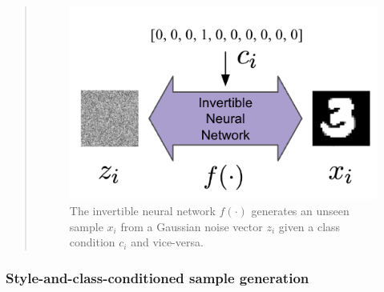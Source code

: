\begin{quote}
\begin{figure}[h]
    \centering
    \includegraphics[width=0.40\columnwidth]{fig_datasynth/class_conditional_generation.png} 
    \caption[Class-conditional sample generation]{\label{fig:class_conditional_generation} The invertible neural network $f(\cdot)$ generates an unseen sample $x_i$ from a Gaussian noise vector $z_i$ given a class condition $c_i$ and vice-versa.} 
\end{figure}

\end{quote}

\subsubsection*{Style-and-class-conditioned sample generation} 


